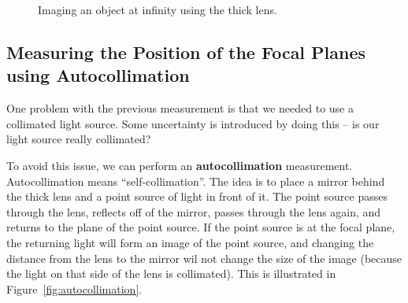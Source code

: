\documentclass[]{manual}
\begin{document}
    \begin{figure}
        \centering


        \caption{
            Imaging an object at infinity using the thick lens.
        }

        \label{fig:object-at-infinity}
    \end{figure}

    \subsection{Measuring the Position of the Focal Planes using Autocollimation}

    One problem with the previous measurement is that we needed to use a collimated light source.
    Some uncertainty is introduced by doing this -- is our light source really collimated?

    To avoid this issue, we can perform an \textbf{autocollimation} measurement.
    Autocollimation means ``self-collimation''.
    The idea is to place a mirror behind the thick lens and a point source of light in front of it.
    The point source passes through the lens, reflects off of the mirror, passes through the lens again, and returns to the plane of the point source.
    If the point source is at the focal plane, the returning light will form an image of the point source, and changing the distance from the lens to the mirror wil not change the size of the image (because the light on that side of the lens is collimated).
    This is illustrated in Figure~\ref{fig:autocollimation}.
\end{document}
